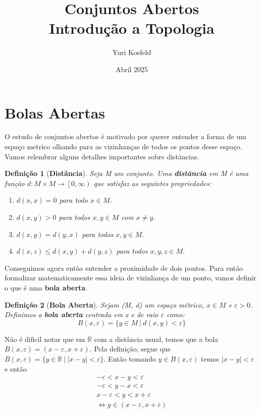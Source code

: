 \documentclass{article}
\title{Conjuntos Abertos \\ \large Introdução a Topologia}
\author{Yuri Kosfeld}
\date{Abril 2025}
\newtheorem*{definition}{Definição}
\begin{document}
\maketitle

\section*{Bolas Abertas}

O estudo de conjuntos abertos é motivado por querer entender a forma de um espaço metrico olhando 
para as vizinhanças de todos os pontos desse espaço. Vamos relembrar alguns
detalhes importantes sobre distâncias.

\begin{definition}[\textbf{Distância}]
    Seja M um conjunto. Uma \textbf{distância} em M é uma função $d: M \times M \rightarrow \left[0, \infty \right)$
    que satisfaz as seguintes propriedades: 
    \begin{enumerate}
        \item $d(x,x) = 0$ para todo $x \in M$.
        \item $d(x,y) > 0$ para todos $x, y \in M$ com $x \neq y$.
        \item $d(x, y) = d(y, x)$ para todos $x,y \in M$.
        \item $d(x,z) \leq d(x, y) + d(y, z)$ para todos $x, y, z \in M$.
    \end{enumerate}
\end{definition}

Conseguimos agora então entender a proximidade de dois pontos. Para então formalizar matematicamente
essa ideia de vizinhança de um ponto, vamos definir o que é uma \textbf{bola aberta}.

\begin{definition}[\textbf{Bola Aberta}]
    Sejam (M, d) um espaço métrico, $x\in M$ e $\varepsilon > 0$. Definimos a \textbf{bola aberta}
    centrada em x e de raio $\varepsilon$ como:
    \[ B(x, \varepsilon) = \{ y \in M \: | \: d(x, y) < \varepsilon \} \]
\end{definition}

Não é dificil notar que em $\mathbb{R}$ com a distância usual, temos que a bola $B(x, \varepsilon) = (x - \varepsilon, x + \varepsilon)$.
Pela definição, segue que $B(x, \varepsilon) = \{ y \in \mathbb{R} \: | \: | x - y | < \varepsilon \}$.
Então tomando $y \in B(x, \varepsilon)$ temos $| x - y | < \varepsilon$ e então
\begin{align*}
    -\varepsilon < x - y < \varepsilon \\
    -\varepsilon < y - x < \varepsilon \\
    x - \varepsilon < y < x + \varepsilon\\
    \Leftrightarrow  y \in (x - \varepsilon, x + \varepsilon)
\end{align*}
\end{document}
